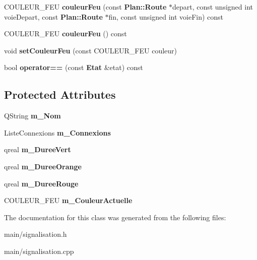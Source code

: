\begin{DoxyCompactItemize}
\item 
\-C\-O\-U\-L\-E\-U\-R\-\_\-\-F\-E\-U {\bfseries couleur\-Feu} (const {\bf \-Plan\-::\-Route} $\ast$depart, const unsigned int voie\-Depart, const {\bf \-Plan\-::\-Route} $\ast$fin, const unsigned int voie\-Fin) const \label{class_signalisation_1_1_etat_aec45cc2f628f09839cb4c63a76948338}

\item 
\-C\-O\-U\-L\-E\-U\-R\-\_\-\-F\-E\-U {\bfseries couleur\-Feu} () const \label{class_signalisation_1_1_etat_a9677a131bb6f391ec110c8b3bc4c5231}

\item 
void {\bfseries set\-Couleur\-Feu} (const \-C\-O\-U\-L\-E\-U\-R\-\_\-\-F\-E\-U couleur)\label{class_signalisation_1_1_etat_a4e55d4be45d33d1a0933e73a589e2477}

\item 
bool {\bfseries operator==} (const {\bf \-Etat} \&etat) const \label{class_signalisation_1_1_etat_a9a8575e8ce5f3c34d91151bee84a3c30}

\end{DoxyCompactItemize}
\subsection*{\-Protected \-Attributes}
\begin{DoxyCompactItemize}
\item 
\-Q\-String {\bfseries m\-\_\-\-Nom}\label{class_signalisation_1_1_etat_af96de3627a5bdba839844b3d6cd22eac}

\item 
\-Liste\-Connexions {\bfseries m\-\_\-\-Connexions}\label{class_signalisation_1_1_etat_a83aaa733ab744c232a0fc990f15bf3b3}

\item 
qreal {\bfseries m\-\_\-\-Duree\-Vert}\label{class_signalisation_1_1_etat_ae0973a978c31fbfe57a6f5ea20137fc4}

\item 
qreal {\bfseries m\-\_\-\-Duree\-Orange}\label{class_signalisation_1_1_etat_ace55ad0c7966010888525bc2f0ad28b7}

\item 
qreal {\bfseries m\-\_\-\-Duree\-Rouge}\label{class_signalisation_1_1_etat_a7937e0138c046279b4d3b83d55c0f87f}

\item 
\-C\-O\-U\-L\-E\-U\-R\-\_\-\-F\-E\-U {\bfseries m\-\_\-\-Couleur\-Actuelle}\label{class_signalisation_1_1_etat_ab5a28ba231c950deb11f23c0ecb85625}

\end{DoxyCompactItemize}


\-The documentation for this class was generated from the following files\-:\begin{DoxyCompactItemize}
\item 
main/signalisation.\-h\item 
main/signalisation.\-cpp\end{DoxyCompactItemize}
